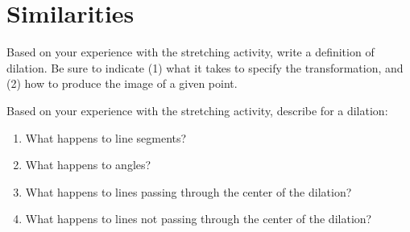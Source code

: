 \newpage

\section{Similarities}


\begin{prob}
Based on your experience with the stretching activity, write a definition of dilation.  Be sure to indicate (1) what it takes to specify the transformation, and (2) how to produce the image of a given point.  
\vspace{0.6in}
\end{prob}

\begin{prob}
Based on your experience with the stretching activity, describe for a dilation: 
\begin{enumerate}
\item What happens to line segments? 
\vspace{0.2in}
\item What happens to angles?  
\vspace{0.2in}
\item What happens to lines passing through the center of the dilation?
\vspace{0.2in}
\item What happens to lines not passing through the center of the dilation?
\vspace{0.2in}
\end{enumerate}
\end{prob}


